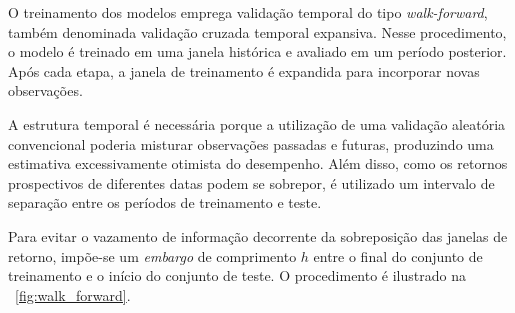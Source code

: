 O treinamento dos modelos emprega validação temporal do tipo \textit{walk-forward}, também denominada validação cruzada temporal expansiva. Nesse procedimento, o modelo é treinado em uma janela histórica e avaliado em um período posterior. Após cada etapa, a janela de treinamento é expandida para incorporar novas observações.

A estrutura temporal é necessária porque a utilização de uma validação aleatória convencional poderia misturar observações passadas e futuras, produzindo uma estimativa excessivamente otimista do desempenho. Além disso, como os retornos prospectivos de diferentes datas podem se sobrepor, é utilizado um intervalo de separação entre os períodos de treinamento e teste.

Para evitar o vazamento de informação decorrente da sobreposição das janelas de retorno, impõe-se um \textit{embargo} de comprimento $h$ entre o final do conjunto de treinamento e o início do conjunto de teste. O procedimento é ilustrado na ~\ref{fig:walk_forward}.

